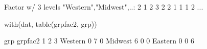 \begin{Schunk}
\begin{Soutput}
 Factor w/ 3 levels "Western","Midwest",..: 2 1 2 3 2 2 1 1 1 2 ...
\end{Soutput}
\begin{Sinput}
  with(dat, table(grpfac2, grp))
\end{Sinput}
\begin{Soutput}
         grp
grpfac2   1 2 3
  Western 0 7 0
  Midwest 6 0 0
  Eastern 0 0 6
\end{Soutput}
\end{Schunk}

